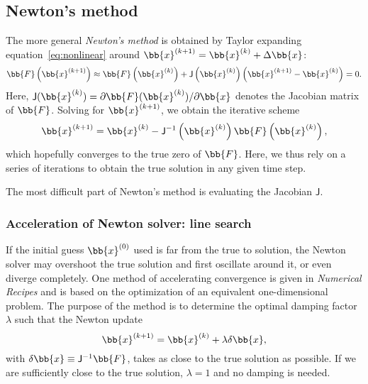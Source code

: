 \documentclass{notes}
\newcommand{\Jac}{\mathsf{J}}
\begin{document}
    \subsection{Newton's method}
    The more general \emph{Newton's method} is obtained by Taylor expanding
    equation~\eqref{eq:nonlinear} around $\bb{x}^{(k+1)} = \bb{x}^{(k)} + \Delta\bb{x}$:
    \begin{equation}
        \bb{F}\left( \bb{x}^{(k+1)} \right)\approx \bb{F}\left(\bb{x}^{(k)}\right) +
        \Jac\left(\bb{x}^{(k)}\right) \left( \bb{x}^{(k+1)} - \bb{x}^{(k)} \right) = 0.
    \end{equation}
    Here, $\Jac(\bb{x}^{(k)}) = \partial\bb{F}(\bb{x}^{(k)})/\partial\bb{x}$
    denotes the Jacobian matrix of $\bb{F}$. Solving for $\bb{x}^{(k+1)}$, we
    obtain the iterative scheme
    \begin{equation}
        \bb{x}^{(k+1)} = \bb{x}^{(k)} - \Jac^{-1}\left( \bb{x}^{(k)} \right) \bb{F}\left( \bb{x}^{(k)} \right),
    \end{equation}
    which hopefully converges to the true zero of $\bb{F}$. Here, we thus rely
    on a series of iterations to obtain the true solution in any given time
    step.

    The most difficult part of Newton's method is evaluating the Jacobian
    $\Jac$.

    \subsubsection{Acceleration of Newton solver: line search}
    If the initial guess $\bb{x}^{(0)}$ used is far from the true to solution,
    the Newton solver may overshoot the true solution and first oscillate around
    it, or even diverge completely. One method of accelerating convergence is
    given in {\em Numerical Recipes} and is based on the optimization of an
    equivalent one-dimensional problem. The purpose of the method is to
    determine the optimal damping factor $\lambda$ such that the Newton update
    \begin{equation}
        \bb{x}^{(k+1)} = \bb{x}^{(k)} + \lambda\delta\bb{x},
    \end{equation}
    with $\delta\bb{x}\equiv\Jac^{-1}\bb{F}$, takes as close to the true
    solution as possible. If we are sufficiently close to the true solution,
    $\lambda=1$ and no damping is needed.
\end{document}
